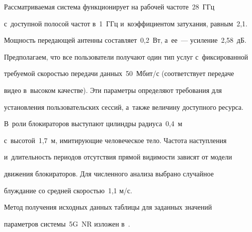   


  Рассматриваемая система функционирует на рабочей частоте~28~ГГц 


с~доступной полосой частот в~1~ГГц и~коэффициентом затухания, равным~2,1. 


Мощность передающей антенны составляет~0,2~Вт, а~ее~--- усиление~2,58~дБ. 


Предполагаем, что все пользователи получают один тип услуг с~фиксированной 


требуемой скоростью передачи данных~50~Мбит\!/\!с (соответствует передаче 


видео в~высоком качестве). Эти параметры определяют требования для 


установления пользовательских сессий, а~также величину доступного ресурса. 


В~роли блокираторов выступают цилиндры радиуса~0,4~м 


с~высотой~1,7~м, имитирующие человеческое тело. Частота наступления 


и~длительность периодов отсутствия прямой ви\-ди\-мости зависят от модели 


движения блокираторов. Для численного анализа выбрано случайное 


блуждание со средней скоростью~1,1 м/с.


  


  Метод получения исходных данных таблицы для заданных значений 


параметров системы~5G~NR изложен в~\cite{2-bs}.


  


